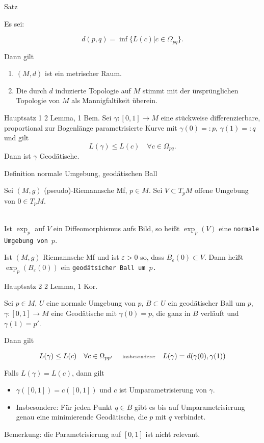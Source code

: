 \documentclass[a6paper,11pt,grid=front]{kartei}
\newcommand{\fl}[1]{\begin{flushleft}
 #1 \end{flushleft}}
\renewcommand{\epsilon}{\varepsilon}
\newcounter{satz}
\begin{document}
\nonameyet
{Satz} {}
{
\fl{Es sei:} 
\vspace{-1.1em}
\[
d(p,q) = \inf \{ L(c) | c \in \Omega_{pq} \}.
\]
\fl{Dann gilt}
\begin{enumerate}[1.]
\item $(M,d)$ ist ein metrischer Raum. 
\item Die durch $d$ induzierte Topologie auf $M$ stimmt mit der ürsprünglichen
Topologie von $M$ als Mannigfaltikeit überein.
\end{enumerate}
}
{}

\nonameyet
{Hauptsatz 1} {\scriptsize 2 Lemma, 1 Bem.}
{
Sei $\gamma : [0,1] \to M$ eine stückweise differenzierbare, proportional
zur Bogenlänge parametrisierte Kurve mit $\gamma(0) = :p$, $\gamma (1) = :q$
und gilt 
\[
L(\gamma)  \leq L(c) \quad \forall c \in \Omega_{pq}. 
\]
Dann ist $\gamma$ Geodätische.
}
{}

\nonameyet
{Definition} {\tiny normale Umgebung, geodätischen Ball}
{
\small
Sei $(M,g)$ (pseudo)-Riemannsche Mf, $p\in M$. 
Sei $V \subset T_p M$ offene Umgebung von $0 \in T_p M$.
\\
~\\
\fl{Ist $\exp_p$ auf $V$ ein
Diffeomorphismus aufs Bild, so heißt
$\exp_p(V)$ eine \texttt{normale Umgebung von $p$}.}
\fl{Ist $(M,g)$ Riemannsche Mf und ist $\epsilon > 0$ so, dass
$B_\epsilon(0) \subset V$. 
Dann heißt $\exp_p(B_\epsilon(0))$ ein \texttt{geodätsicher Ball um $p$.}}
}
{}

\nonameyet
{Hauptsatz 2} {\scriptsize 2 Lemma, 1 Kor.}
{
\small
Sei $p\in M$, $U$ eine normale Umgebung von $p$, $B \subset U$ ein 
geodätischer Ball um $p$, $\gamma:[0,1] \to M$ eine Geodätische mit 
$\gamma(0) = p$, die ganz in $B$ verläuft und $\gamma(1) = p'$.
%
\fl{Dann gilt}  
\[
L(\gamma) \leq L(c) \quad \forall c \in \Omega_{pp'}
\quad \text { \scriptsize insbesondere:} \quad 
L(\gamma) = d(\gamma(0),\gamma(1))
\]
\fl{Falls $L(\gamma) = L(c)$, dann gilt }
\begin{itemize}[-]
\item $\gamma([0,1]) = c([0,1])$ und $c$ ist Umparametrisierung von $\gamma$.
\item Insbesondere: Für jeden Punkt $q \in B$ gibt es bis auf Umparametrisierung
genau eine minimierende Geodätische, die $p$ mit $q$ verbindet.
\end{itemize}
Bemerkung: die Parametrisierung auf $[0,1]$ ist nicht relevant.
}
{}
\end{document}
